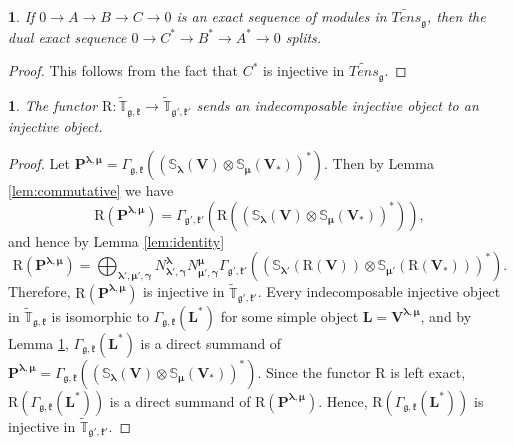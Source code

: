 \documentclass[12pt,oneside,english]{amsart}
\numberwithin{equation}{section}
\numberwithin{figure}{section}
\theoremstyle{plain}
\theoremstyle{plain}
\newtheorem{lem}[thm]{\protect\lemmaname}
\theoremstyle{remark}
\theoremstyle{definition}
\theoremstyle{plain}
\theoremstyle{remark}
\theoremstyle{definition}
\theoremstyle{plain}
\theoremstyle{plain}
\theoremstyle{definition}
\providecommand{\lemmaname}{Lemma}
\newcommand{\bP}{\mathbf{P}}
\newcommand{\bV}{\mathbf{V}}
\newcommand{\bL}{\mathbf{L}}
\newcommand{\fg}{\mathfrak{g}}
\newcommand{\fk}{\mathfrak{k}}
\begin{document}
    \begin{lem}\label{lem:dual} If $0\to A\to B\to C\to 0$ is an exact sequence of modules in $\widetilde{Tens}_{\fg}$, then the dual exact sequence $0\to C^*\to B^*\to A^*\to 0$ splits.
    \end{lem}
    \begin{proof} This follows from the fact that $C^*$ is injective in $\widetilde{Tens}_{\fg}$.
      \end{proof}

      \begin{lem}\label{lem:injective} The functor $\mathrm{R}: \widetilde{\mathbb T}_{\fg,\fk}\to  \widetilde{\mathbb T}_{\fg',\fk'}$ sends an  indecomposable  injective object to an injective object.
\end{lem}
\begin{proof} Let $\bP^{\boldsymbol{\lambda},\boldsymbol{\mu}}=\Gamma_{\fg,\fk}((\mathbb{S}_{\boldsymbol{\lambda}}(\bV)\otimes \mathbb{S}_{{\boldsymbol{\mu}}}(\bV_*))^*)$. Then by Lemma \ref{lem:commutative} we have
  $$\mathrm{R}(\bP^{\boldsymbol{\lambda},\boldsymbol{\mu}})=\Gamma_{\fg',\fk'}(\mathrm{R}((\mathbb{S}_{\boldsymbol{\lambda}}(\bV)\otimes \mathbb{S}_{{\boldsymbol{\mu}}}(\bV_*))^*)),$$  and hence by Lemma \ref{lem:identity}
  \begin{equation} \label{formula RI} \mathrm{R}(\bP^{\boldsymbol{\lambda},\boldsymbol{\mu}})=\bigoplus_{\boldsymbol{\lambda'},\boldsymbol{\mu'},{\boldsymbol{\gamma}}} N^{\boldsymbol{\lambda}}_{\boldsymbol{\lambda}',{\boldsymbol{\gamma}}}N^{{\boldsymbol{\mu}}}_{{\boldsymbol{\mu}}',{\boldsymbol{\gamma}}}\Gamma_{\fg',\fk'}((\mathbb{S}_{\boldsymbol{\lambda}'}(\mathrm{R}(\bV))\otimes \mathbb{S}_{{\boldsymbol{\mu}}'}(\mathrm{R}(\bV_*)))^*).\end{equation}
  Therefore, $\mathrm{R}(\bP^{\boldsymbol{\lambda},\boldsymbol{\mu}})$ is injective in $\widetilde{\mathbb T}_{\fg',\fk'}$. Every indecomposable injective object in  $\widetilde{\mathbb T}_{\fg,\fk}$ is isomorphic to $\Gamma_{\fg,\fk}(\bL^*)$
  for some simple object   $\bL=\bV^{\boldsymbol{\lambda},{\boldsymbol{\mu}}}$, and by  Lemma \ref{lem:dual},  $\Gamma_{\fg,\fk}(\bL^*)$ is a  direct summand of $\bP^{\boldsymbol{\lambda},\boldsymbol{\mu}}=\Gamma_{\fg,\fk}((\mathbb{S}_{\boldsymbol{\lambda}}(\bV)\otimes \mathbb{S}_{{\boldsymbol{\mu}}}(\bV_*))^*)$. Since the functor $\mathrm{R}$ is left exact,  $\mathrm{R}(\Gamma_{\fg,\fk}(\bL^*))$ is a direct summand of $\mathrm{R}(\bP^{\boldsymbol{\lambda},\boldsymbol{\mu}})$.  Hence, $\mathrm{R}(\Gamma_{\fg,\fk}(\bL^*))$ is injective in  $\widetilde{\mathbb T}_{\fg',\fk'}$.
\end{proof}
\end{document}
